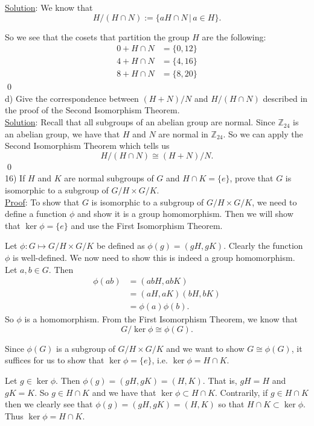 \documentclass{article}
\begin{document}
\underline{Solution}: We know that
$$ H / (H \cap N) := \{ aH \cap N \, \vert \, a \in H \}.$$

So we see that the cosets that partition the group $H$ are the following:
\begin{align*}
	0 + H \cap N &= \{0, 12\} \\
	4 + H \cap N &= \{4, 16\}  \\
	8 + H \cap N &= \{8, 20\}
\end{align*} \qed \\

d) Give the correspondence between $(H+N)/N$ and $H/(H \cap N)$ described in the proof of the Second Isomorphism Theorem. \\

\underline{Solution}: Recall that all subgroups of an abelian group are normal. Since $\mathbb{Z}_{24}$ is an abelian group, we have that $H$ and $N$ are normal in $\mathbb{Z}_{24}$. So we can apply the Second Isomorphism Theorem which tells us
$$H / (H \cap N) \cong (H+N) / N.$$ \qed \\

16) If $H$ and $K$ are normal subgroups of $G$ and $H \cap K = \{ {e} \}$, prove that $G$ is isomorphic to a subgroup of $G/H \times G/K$. \\

\underline{Proof}: To show that $G$ is isomorphic to a subgroup of $G/H \times G/K$, we need to define a function $\phi$ and show it is a group homomorphism. Then we will show that $\ker \phi = \{e\}$ and use the First Isomorphism Theorem.

Let $\phi : G \mapsto G/H \times G/K$ be defined as $\phi(g) = (gH, gK)$. Clearly the function $\phi$ is well-defined. We now need to show this is indeed a group homomorphism. Let $a, b \in G$. Then
\begin{align*}
	\phi(ab) &= (abH, abK) \\
	&= (aH, aK)(bH, bK) \\
	&= \phi(a)\phi(b).
\end{align*} So $\phi$ is a homomorphism. From the First Isomorphism Theorem, we know that 
$$G / \ker \phi \cong \phi(G).$$

Since $\phi(G)$ is a subgroup of $G/H \times G/K$ and we want to show $G \cong \phi(G)$, it suffices for us to show that $\ker \phi = \{ e \}$, i.e. $\ker \phi = H \cap K$. 

Let $g \in \ker \phi$. Then $\phi(g) = (gH, gK) = (H, K)$. That is, $gH = H$ and $gK = K$. So $g \in H \cap K$ and we have that $\ker \phi \subset H \cap K$. Contrarily, if $g \in H \cap K$ then we clearly see that $\phi(g) = (gH, gK) = (H, K)$ so that $H \cap K \subset \ker \phi$. Thus $\ker \phi = H \cap K$.
\end{document}
